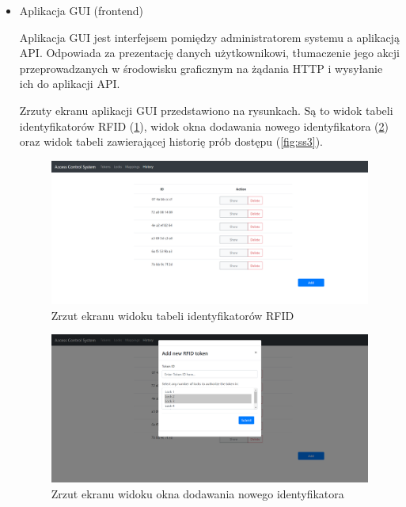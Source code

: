     	\begin{itemize}
    		\item Aplikacja GUI (frontend)

				Aplikacja GUI jest interfejsem pomiędzy administratorem systemu a aplikacją API. Odpowiada za prezentację danych użytkownikowi, tłumaczenie jego akcji przeprowadzanych w środowisku graficznym na żądania HTTP i wysyłanie ich do aplikacji API.

				Zrzuty ekranu aplikacji GUI przedstawiono na rysunkach. Są to widok tabeli identyfikatorów RFID (\ref{fig:ss1}), widok okna dodawania nowego identyfikatora (\ref{fig:ss2}) oraz widok tabeli zawierającej historię prób dostępu (\ref{fig:ss3}).

				\begin{figure}[]
		            \centering
		            \includegraphics[width=\textwidth, frame]{chapters/images/ss1.png}
		            \caption{Zrzut ekranu widoku tabeli identyfikatorów RFID}
		            \label{fig:ss1}
		        \end{figure}

		        \begin{figure}[]
		            \centering
		            \includegraphics[width=\textwidth]{chapters/images/ss2.png}
		            \caption{Zrzut ekranu widoku okna dodawania nowego identyfikatora}
		            \label{fig:ss2}
		        \end{figure}


\end{itemize}
